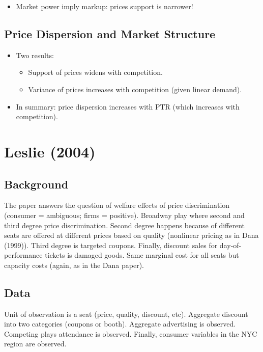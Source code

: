 \begin{itemize}
\item Market power imply markup: prices support is narrower!
\end{itemize}

\subsection{Price Dispersion and Market Structure}

\begin{itemize}
\item Two results:
\begin{itemize}
\item Support of prices widens with competition.
\item Variance of prices increases with competition (given linear demand).
\end{itemize}
\item In summary: price dispersion increases with PTR (which increases with competition).
\end{itemize}

\section{Leslie (2004)}

\subsection{Background}

The paper answers the question of welfare effects of price discrimination (consumer = ambiguous; firms = positive). Broadway play where second and third degree price discrimination. Second degree happens because of different seats are offered at different prices based on quality (nonlinear pricing as in Dana (1999)). Third degree is targeted coupons. Finally, discount sales for day-of-performance tickets is damaged goods. Same marginal cost for all seats but capacity costs (again, as in the Dana paper).

\subsection{Data}

Unit of observation is a seat (price, quality, discount, etc). Aggregate discount into two categories (coupons or booth). Aggregate advertising is observed. Competing plays attendance is observed. Finally, consumer variables in the NYC region are observed.

